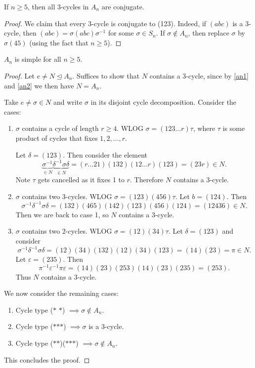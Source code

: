 \documentclass[egregdoesnotlikesansseriftitles,a4paper]{scrartcl}
\begin{document}
\begin{lemma}\label{an2}
     If $n \geq 5$, then all 3-cycles in $A_n$ are conjugate. 
\end{lemma}
\begin{proof}
     We claim that every 3-cycle is conjugate to (123). Indeed, if $(abc)$ is a 3-cycle, then $(abc)=\sigma (abc) {\sigma}^{-1}$ for some $\sigma \in S_n$. If $\sigma \notin A_{n}$, then replace $\sigma$ by $\sigma (45)$ (using the fact that $n \geq 5$).
\end{proof}
\begin{theorem}
      $A_n$ is simple for all $n \geq 5$.
      \begin{proof}
            Let $e \neq N \unlhd A_{n}$. Suffices to show that $N$ contains a 3-cycle, since by \ref{an1} and \ref{an2} we then have $N=A_n$.
      
            Take $e \neq \sigma \in N$ and write $\sigma$ in its disjoint cycle decomposition. Consider the cases: 
            \begin{enumerate}
                 \item  $\sigma$ contains a cycle of length $r \geq 4$. WLOG $\sigma=(123 \ldots r)\tau$, where $\tau$ is some product of cycles that fixes $1,2, \ldots ,r$. 
                 
                 Let $\delta =(123)$. Then consider the element \[
                 \underbrace{{\sigma}^{-1}}_{\in N} \underbrace{{\delta}^{-1} \sigma \delta}_{\in N} = (r \ldots 21)(132)(12 \ldots r)(123)=(23r) \in N
                 .\] Note $\tau$ gets cancelled as it fixes 1 to $r$. Therefore $N$ contains a 3-cycle. 
                 \item $\sigma$ contains two 3-cycles. WLOG $\sigma= (123)(456)\tau$. Let $b=(124).$ Then \[
                     {\sigma}^{-1} {\delta}^{-1} \sigma \delta = (132)(465)(142)(123)(456)(124)=(12436) \in N
                .\] Then we are back to case 1, so $N$ contains a 3-cycle.
                \item $\sigma$ contains two 2-cycles. WLOG $\sigma=(12)(34)\tau$. Let $\delta=(123)$ and consider \[
                     {\sigma}^{-1} {\delta}^{-1} \sigma \delta = (12)(34)(132)(12)(34)(123)=(14)(23)=\pi \in N
                     .\] Let $\varepsilon= (235)$. Then \[
                     {\pi}^{-1}{\varepsilon}^{-1}\pi \varepsilon =(14)(23)(253)(14)(23)(235)=(253)
                     .\] Thus $N$ contains a 3-cycle.
            \end{enumerate}
            We now consider the remaining cases:
            \begin{enumerate}
                 \item Cycle type ($\ast$ $\ast$) $\implies \sigma \notin A_n$.
                 \item Cycle type ($\ast$$\ast$$\ast$) $\implies \sigma$ is a 3-cycle.
                 \item Cycle type ($\ast$$\ast$)($\ast$$\ast$$\ast$) $\implies  \sigma \notin A_n$. 
            \end{enumerate}
            This concludes the proof.
      \end{proof}
\end{theorem}
\end{document}
